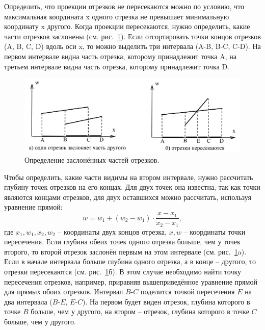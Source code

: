 Определить, что проекции отрезков не пересекаются можно по условию, что максимальная координата x одного отрезка не превышает минимальную координату x другого. Когда проекции пересекаются, нужно определить, какие части отрезков заслонены (см. рис.~\ref{fig:Sbuff_algorithm_2}). Если отсортировать точки концов отрезков (A, B, C, D) вдоль оси x, то можно выделить три интервала (A-B, B-C, C-D). На первом интервале видна часть отрезка, которому принадлежит точка A, на третьем интервале видна часть отрезка, которому принадлежит точка D.

\begin{figure}[H]
    \centering
    \includegraphics[width=\textwidth]{img/Sbuff_algorithm_2.png}
    \caption{Определение заслонённых частей отрезков.}
    \label{fig:Sbuff_algorithm_2}
\end{figure}

Чтобы определить, какие части видимы на втором интервале, нужно рассчитать глубину точек отрезков на его концах. Для двух точек она известна, так как точки являются концами отрезков, для двух оставшихся
можно рассчитать, используя уравнение прямой:
\begin{equation}
w = w_1 + (w_2 - w_1) \cdot \frac{x - x_1}{x_2 - x_1},
\end{equation}
где $x_1, w_1, x_2, w_2$ – координаты двух концов отрезка, $x, w$ – координаты точки пересечения. Если глубина обеих точек одного отрезка больше, чем у точек второго, то второй отрезок заслонён первым на этом интервале (см. рис.~\ref{fig:Sbuff_algorithm_2}a). Если в начале интервала больше глубина одного отрезка, а в конце – другого, то отрезки пересекаются (см. рис.~\ref{fig:Sbuff_algorithm_2}б). В этом случае необходимо найти точку пересечения отрезков, например, приравняв вышеприведённое уравнение прямой для прямых обоих отрезков. Интервал $B$-$C$ поделится точкой пересечения $E$ на два интервала ($B$-$E$, $E$-$C$). На первом будет виден отрезок, глубина которого в точке $B$ больше, чем у другого, на втором – отрезок, глубина которого в точке $C$ больше, чем у другого.~\cite{polski}

